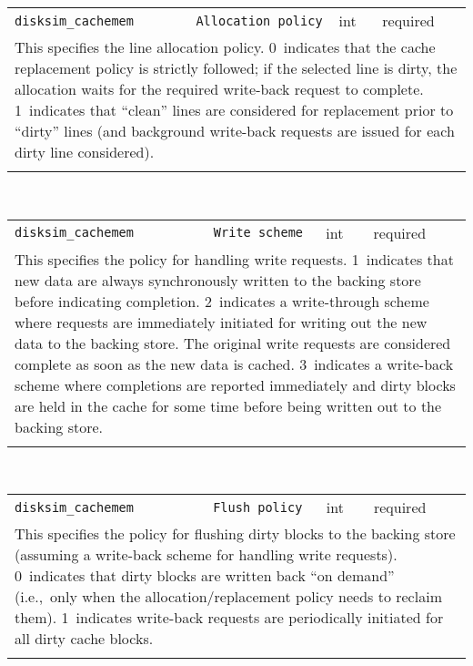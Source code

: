 \noindent 
\begin{tabular}{|p{\lpmodwidth}|p{\lpnamewidth}|p{0.5in}|p{0.5in}|}
\cline{1-4}
\texttt{disksim\_cachemem} & \texttt{Allocation policy} & int & required \\ 
\cline{1-4}
\multicolumn{4}{|p{6in}|}{
This specifies the line allocation policy.
0~indicates that the cache replacement policy is strictly followed; if
the selected line is dirty, the allocation waits for the required
write-back request to complete.
1~indicates that ``clean'' lines are considered for replacement prior
to ``dirty'' lines (and background write-back requests are issued for
each dirty line considered).
}\\ 
\cline{1-4}
\multicolumn{4}{p{5in}}{}\\
\end{tabular}\\ 
\noindent 
\begin{tabular}{|p{\lpmodwidth}|p{\lpnamewidth}|p{0.5in}|p{0.5in}|}
\cline{1-4}
\texttt{disksim\_cachemem} & \texttt{Write scheme} & int & required \\ 
\cline{1-4}
\multicolumn{4}{|p{6in}|}{
This specifies the policy for handling write requests.
1~indicates that new data are always synchronously written to the
backing store before indicating completion.
2~indicates a write-through scheme where requests are immediately
initiated for writing out the new data to the backing store. The
original write requests are considered complete as soon as the new
data is cached.
3~indicates a write-back scheme where completions are reported
immediately and dirty blocks are held in the cache for some time
before being written out to the backing store.
}\\ 
\cline{1-4}
\multicolumn{4}{p{5in}}{}\\
\end{tabular}\\ 
\noindent 
\begin{tabular}{|p{\lpmodwidth}|p{\lpnamewidth}|p{0.5in}|p{0.5in}|}
\cline{1-4}
\texttt{disksim\_cachemem} & \texttt{Flush policy} & int & required \\ 
\cline{1-4}
\multicolumn{4}{|p{6in}|}{
This specifies the policy for flushing dirty blocks to the backing store
(assuming a write-back scheme for handling write requests).
0~indicates that dirty blocks are written back ``on demand''
(i.e.,~only when the allocation/replacement policy needs to reclaim
them).
1~indicates write-back requests are periodically initiated for all
dirty cache blocks.
}\\ 
\cline{1-4}
\multicolumn{4}{p{5in}}{}\\
\end{tabular}\\ 
